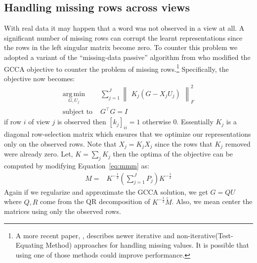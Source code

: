 \documentclass[11pt]{article}
\begin{document}
\subsection{Handling missing rows across views}
\label{ssec:missing}
With real data it may happen that a word was not observed in a view at
all. A significant number of 
missing rows can corrupt the learnt representations since the rows
in the left singular matrix become zero.
To counter this problem we adopted a variant of the ``missing-data
passive'' algorithm from \cite{van2006generalized} who modified the
GCCA objective to counter the problem of missing 
rows.\footnote{A more recent paper, \cite{van2012generalized},
  describes newer iterative and non-iterative(Test-Equating Method)
  approaches for handling missing values. It is possible that using
  one of those methods could improve performance.}
Specifically, the objective now becomes:
\begin{equation}
  \label{eq:gcca2}
\begin{split}
  \operatorname*{arg\,min}_{G,U_j} & \sum_{j=1}^J \begin{Vmatrix} K_j(G - X_jU_j) \end{Vmatrix}^2_F \\
  \text{subject to } & G^\top G = I
\end{split}
\end{equation}
if row $i$ of view $j$ is observed then $[k_j]_{ii} = 1$ otherwise $0$.
Essentially $K_j$ is a diagonal row-selection matrix which ensures
that we optimize our representations only on the observed rows. Note that
$X_j = K_jX_j$ since the rows that $K_j$ removed were already
zero. Let, $K =
\sum_j K_j$ then the optima
of the objective can be computed by modifying Equation~\ref{eq:mmm} as:
\begin{align}
  M =& K^{-\frac{1}{2}}(\sum_{j=1}^J P_j)K^{-\frac{1}{2}}
\end{align}
Again if we regularize and approximate the GCCA solution, we get
$G=QU$ where $Q, R$ come from the QR decomposition of
$K^{-\frac{1}{2}}\tilde{M}$. Also, we mean center the matrices using
only the observed rows.
\end{document}
